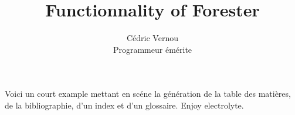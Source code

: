\documentclass[11pt]{article}
\begin{document}
\title{Functionnality of Forester}
\author{Cédric Vernou\\
Programmeur émérite}

\maketitle
\tableofcontents
\newpage

Voici un court example mettant en scéne la génération de la table des matières, de la bibliographie, d'un index et d'un glossaire\cite{ARTMCCDDS}.
Enjoy \gls{electrolyte}.





\printglossaries



\end{document}
